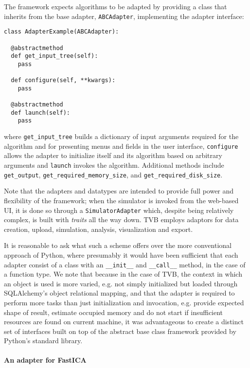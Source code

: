 \documentclass{bioinfo}
\begin{document}
The framework expects algorithms to be adapted by providing a class
that inherits from the base adapter, \texttt{ABCAdapter}, implementing 
the adapter interface:

\begin{lstlisting}[caption={Excerpt of the ABCAdapter},
                   label={lst:ABCAdapter}]
class AdapterExample(ABCAdapter):

  @abstractmethod
  def get_input_tree(self):
  	pass

  def configure(self, **kwargs):
  	pass

  @abstractmethod
  def launch(self):
  	pass
\end{lstlisting}


\noindent where \texttt{get\_input\_tree} builds a dictionary of input
arguments required for the algorithm and for presenting menus and fields in the
user interface, \texttt{configure} allows the adapter to initialize itself and
its algorithm based on arbitrary arguments and \texttt{launch} invokes the
algorithm.  Additional methods include \texttt{get\_output},
\texttt{get\_required\_memory\_size}, and \texttt{get\_required\_disk\_size}.

Note that the adapters and datatypes are intended to provide full power and
flexibility of the framework; when the simulator is invoked from the web-based
UI, it is done so through a \texttt{SimulatorAdapter} which, despite being
relatively complex, is built with \emph{traits} all the way down.  TVB employs
adaptors for data creation, upload, simulation, analysis, visualization and
export. 

It is reasonable to ask what such a scheme offers over the more 
conventional approach of Python, where presumably it would have been
sufficient that each adapter consist of a class with an \texttt{\_\_init\_\_}
and \texttt{\_\_call\_\_} method, in the case of a function type. 
We note that because in the case of TVB, the context in which an object
is used is more varied, e.g. not simply initialized but loaded through 
SQLAlchemy's object relational mapping, and that the adapter is required to perform more tasks
than just initialization and invocation, e.g. provide expected shape of 
result, estimate occupied memory and do not start if insufficient resources are found on current machine,
 it was advantageous to create a distinct set of interfaces built on top of
the abstract base class framework provided by Python's standard library.

\paragraph{An adapter for FastICA}
\end{document}
